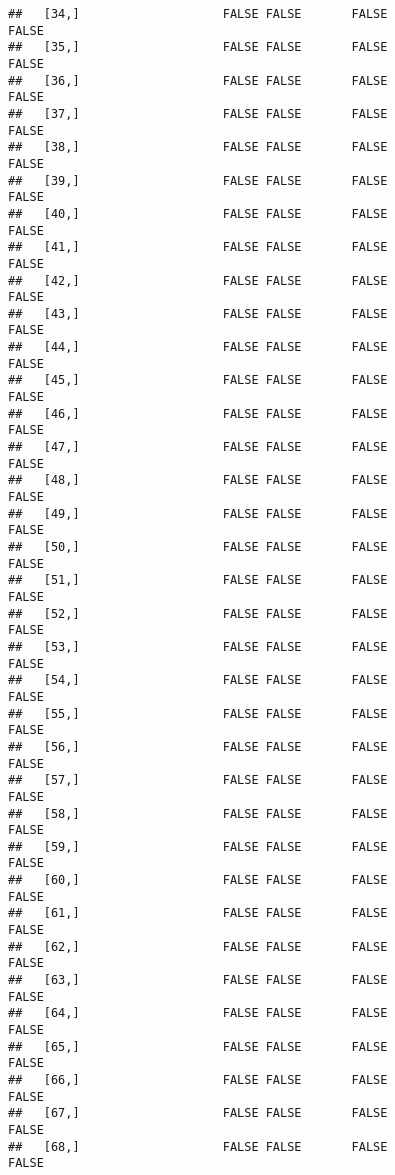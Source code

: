 \documentclass[
]{article}
\begin{document}
\begin{verbatim}
##   [34,]                    FALSE FALSE       FALSE                FALSE
##   [35,]                    FALSE FALSE       FALSE                FALSE
##   [36,]                    FALSE FALSE       FALSE                FALSE
##   [37,]                    FALSE FALSE       FALSE                FALSE
##   [38,]                    FALSE FALSE       FALSE                FALSE
##   [39,]                    FALSE FALSE       FALSE                FALSE
##   [40,]                    FALSE FALSE       FALSE                FALSE
##   [41,]                    FALSE FALSE       FALSE                FALSE
##   [42,]                    FALSE FALSE       FALSE                FALSE
##   [43,]                    FALSE FALSE       FALSE                FALSE
##   [44,]                    FALSE FALSE       FALSE                FALSE
##   [45,]                    FALSE FALSE       FALSE                FALSE
##   [46,]                    FALSE FALSE       FALSE                FALSE
##   [47,]                    FALSE FALSE       FALSE                FALSE
##   [48,]                    FALSE FALSE       FALSE                FALSE
##   [49,]                    FALSE FALSE       FALSE                FALSE
##   [50,]                    FALSE FALSE       FALSE                FALSE
##   [51,]                    FALSE FALSE       FALSE                FALSE
##   [52,]                    FALSE FALSE       FALSE                FALSE
##   [53,]                    FALSE FALSE       FALSE                FALSE
##   [54,]                    FALSE FALSE       FALSE                FALSE
##   [55,]                    FALSE FALSE       FALSE                FALSE
##   [56,]                    FALSE FALSE       FALSE                FALSE
##   [57,]                    FALSE FALSE       FALSE                FALSE
##   [58,]                    FALSE FALSE       FALSE                FALSE
##   [59,]                    FALSE FALSE       FALSE                FALSE
##   [60,]                    FALSE FALSE       FALSE                FALSE
##   [61,]                    FALSE FALSE       FALSE                FALSE
##   [62,]                    FALSE FALSE       FALSE                FALSE
##   [63,]                    FALSE FALSE       FALSE                FALSE
##   [64,]                    FALSE FALSE       FALSE                FALSE
##   [65,]                    FALSE FALSE       FALSE                FALSE
##   [66,]                    FALSE FALSE       FALSE                FALSE
##   [67,]                    FALSE FALSE       FALSE                FALSE
##   [68,]                    FALSE FALSE       FALSE                FALSE

\end{verbatim}
\end{document}
